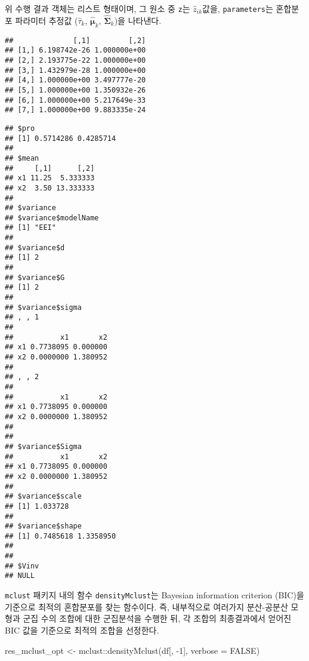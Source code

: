 \documentclass[
]{book}
\newenvironment{Shaded}{\begin{snugshade}}{\end{snugshade}}
\newcommand{\AttributeTok}[1]{\textcolor[rgb]{0.77,0.63,0.00}{#1}}
\newcommand{\ConstantTok}[1]{\textcolor[rgb]{0.00,0.00,0.00}{#1}}
\newcommand{\DecValTok}[1]{\textcolor[rgb]{0.00,0.00,0.81}{#1}}
\newcommand{\FunctionTok}[1]{\textcolor[rgb]{0.00,0.00,0.00}{#1}}
\newcommand{\NormalTok}[1]{#1}
\newcommand{\OtherTok}[1]{\textcolor[rgb]{0.56,0.35,0.01}{#1}}
\newcommand{\SpecialCharTok}[1]{\textcolor[rgb]{0.00,0.00,0.00}{#1}}
\begin{document}
위 수행 결과 객체는 리스트 형태이며, 그 원소 중 \texttt{z}는 \(\hat{z}_{ik}\)값을, \texttt{parameters}는 혼합분포 파라미터 추정값 (\(\hat{\tau}_k\), \(\hat{\boldsymbol\mu}_k\), \(\hat{\boldsymbol\Sigma}_k\))을 나타낸다.

\begin{Shaded}
\end{Shaded}

\begin{verbatim}
##              [,1]         [,2]
## [1,] 6.198742e-26 1.000000e+00
## [2,] 2.193775e-22 1.000000e+00
## [3,] 1.432979e-28 1.000000e+00
## [4,] 1.000000e+00 3.497777e-20
## [5,] 1.000000e+00 1.350932e-26
## [6,] 1.000000e+00 5.217649e-33
## [7,] 1.000000e+00 9.883335e-24
\end{verbatim}

\begin{Shaded}
\end{Shaded}

\begin{verbatim}
## $pro
## [1] 0.5714286 0.4285714
## 
## $mean
##     [,1]      [,2]
## x1 11.25  5.333333
## x2  3.50 13.333333
## 
## $variance
## $variance$modelName
## [1] "EEI"
## 
## $variance$d
## [1] 2
## 
## $variance$G
## [1] 2
## 
## $variance$sigma
## , , 1
## 
##           x1       x2
## x1 0.7738095 0.000000
## x2 0.0000000 1.380952
## 
## , , 2
## 
##           x1       x2
## x1 0.7738095 0.000000
## x2 0.0000000 1.380952
## 
## 
## $variance$Sigma
##           x1       x2
## x1 0.7738095 0.000000
## x2 0.0000000 1.380952
## 
## $variance$scale
## [1] 1.033728
## 
## $variance$shape
## [1] 0.7485618 1.3358950
## 
## 
## $Vinv
## NULL
\end{verbatim}

\texttt{mclust} 패키지 내의 함수 \texttt{densityMclust}는 Bayesian information criterion (BIC)을 기준으로 최적의 혼합분포를 찾는 함수이다. 즉, 내부적으로 여러가지 분산-공분산 모형과 군집 수의 조합에 대한 군집분석을 수행한 뒤, 각 조합의 최종결과에서 얻어진 BIC 값을 기준으로 최적의 조합을 선정한다.

\begin{Shaded}
\begin{Highlighting}[]
\NormalTok{res\_mclust\_opt }\OtherTok{\textless{}{-}}\NormalTok{ mclust}\SpecialCharTok{::}\FunctionTok{densityMclust}\NormalTok{(df[, }\SpecialCharTok{{-}}\DecValTok{1}\NormalTok{], }\AttributeTok{verbose =} \ConstantTok{FALSE}\NormalTok{)}
\end{Highlighting}
\end{Shaded}
\end{document}
